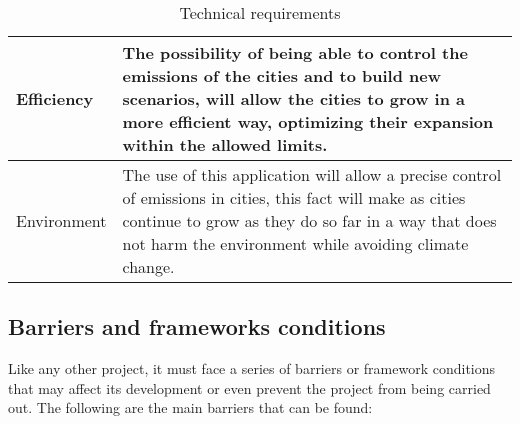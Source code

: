 \begin{table}[H]
\begin{tabular}{l p{13.3cm}}
		\midrule
		
		Efficiency & The possibility of being able to control the emissions of the cities and to build new scenarios, will allow the cities to grow in a more efficient way, optimizing their expansion within the allowed limits.\vspace{0.2cm}\\
		
		\midrule
		
		Environment & The use of this application will allow a precise control of emissions in cities, this fact will make as cities continue to grow as they do so far in a way that does not harm the environment while avoiding climate change.\vspace{0.2cm}\\
		
		
		\bottomrule[2pt]
		
	\end{tabular}
	\caption{Technical requirements}
\end{table}

\subsection{Barriers and frameworks conditions}

Like any other project, it must face a series of barriers or framework conditions that may affect its development or even prevent the project from being carried out. The following are the main barriers that can be found:

